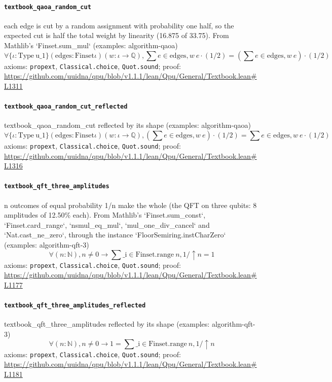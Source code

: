 \documentclass[11pt]{article}
\begin{document}
\paragraph{\texttt{textbook\_qaoa\_random\_cut}}
each edge is cut by a random assignment with probability one half, so the expected cut is half the total weight by linearity (16.875 of 33.75). From Mathlib's `Finset.sum\_mul` (examples: algorithm-qaoa)
\[ \forall \{\iota : \mathrm{Type}\ \mathrm{u\_1}\} (\mathrm{edges} : \mathrm{Finset} \iota ) (w : \iota \to \mathbb{Q}), \sum e \in \mathrm{edges}, w\ e \cdot (1 / 2) = (\sum e \in \mathrm{edges}, w\ e) \cdot (1 / 2) \]
\noindent axioms: \texttt{propext}, \texttt{Classical.choice}, \texttt{Quot.sound}; proof: \url{https://github.com/uuidna/qpu/blob/v1.1.1/lean/Qpu/General/Textbook.lean\#L1311}

\paragraph{\texttt{textbook\_qaoa\_random\_cut\_reflected}}
textbook\_qaoa\_random\_cut reflected by its shape (examples: algorithm-qaoa)
\[ \forall \{\iota : \mathrm{Type}\ \mathrm{u\_1}\} (\mathrm{edges} : \mathrm{Finset} \iota ) (w : \iota \to \mathbb{Q}), (\sum e \in \mathrm{edges}, w\ e) \cdot (1 / 2) = \sum e \in \mathrm{edges}, w\ e \cdot (1 / 2) \]
\noindent axioms: \texttt{propext}, \texttt{Classical.choice}, \texttt{Quot.sound}; proof: \url{https://github.com/uuidna/qpu/blob/v1.1.1/lean/Qpu/General/Textbook.lean\#L1316}

\paragraph{\texttt{textbook\_qft\_three\_amplitudes}}
n outcomes of equal probability 1/n make the whole (the QFT on three qubits: 8 amplitudes of 12.50\% each). From Mathlib's `Finset.sum\_const`, `Finset.card\_range`, `nsmul\_eq\_mul`, `mul\_one\_div\_cancel` and `Nat.cast\_ne\_zero`, through the instance `FloorSemiring.instCharZero` (examples: algorithm-qft-3)
\[ \forall (n : \mathbb{N}), n \ne 0 \to \sum \mathrm{\_i} \in \mathrm{Finset.range}\ n, 1 / \uparrow n = 1 \]
\noindent axioms: \texttt{propext}, \texttt{Classical.choice}, \texttt{Quot.sound}; proof: \url{https://github.com/uuidna/qpu/blob/v1.1.1/lean/Qpu/General/Textbook.lean\#L1177}

\paragraph{\texttt{textbook\_qft\_three\_amplitudes\_reflected}}
textbook\_qft\_three\_amplitudes reflected by its shape (examples: algorithm-qft-3)
\[ \forall (n : \mathbb{N}), n \ne 0 \to 1 = \sum \mathrm{\_i} \in \mathrm{Finset.range}\ n, 1 / \uparrow n \]
\noindent axioms: \texttt{propext}, \texttt{Classical.choice}, \texttt{Quot.sound}; proof: \url{https://github.com/uuidna/qpu/blob/v1.1.1/lean/Qpu/General/Textbook.lean\#L1181}
\end{document}
